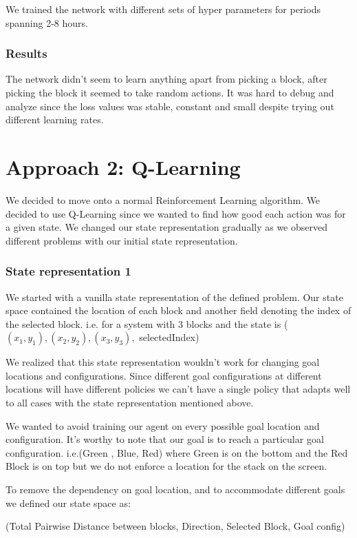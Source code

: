 \documentclass[letterpaper, 12 pt, conference]{ieeeconf}
\begin{document}
We trained the network with different sets of hyper parameters for periods spanning 2-8 hours.
\subsubsection{Results}

The network didn't seem to learn anything apart from picking a block, after picking the block it seemed to take random actions. It was hard to debug and analyze since the loss values was stable, constant and small despite trying out different learning rates.


\section{Approach 2: Q-Learning}
We decided to move onto a normal Reinforcement Learning algorithm. We decided to use Q-Learning since we wanted to find how good each action was for a given state. We changed our state representation gradually as we observed different problems with our initial state representation.

\subsubsection{State representation 1}

We started with a vanilla state representation of the defined problem. Our state space contained the location of each block and another field denoting the index of the selected block. 
i.e. for a system with 3 blocks and the state is ($(x_1, y_1), (x_2, y_2), (x_3, y_3),$ selectedIndex) 

We realized that this state representation wouldn't work for changing goal locations and configurations. Since different goal configurations at different locations will have different policies we can't have a single policy that adapts well to all cases with the state representation mentioned above. 

We wanted to avoid training our agent on every possible goal location and configuration. It’s worthy to note that our goal is to reach a particular goal configuration. i.e.(Green , Blue, Red) where Green is on the bottom and the Red Block is on top but we do not enforce a location for the stack on the screen. 

To remove the dependency on goal location, and to accommodate different goals we defined our state space as:

(Total Pairwise Distance between blocks, Direction, Selected Block, Goal config)
\end{document}
